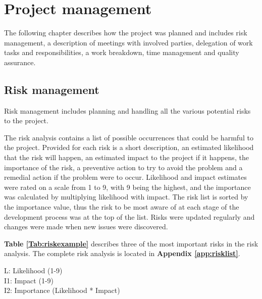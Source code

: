 
\chapter{Project management}

The following chapter describes how the project was planned and includes risk management, a description of meetings with involved parties, delegation of work tasks and responsibilities, a work breakdown, time management and quality assurance.

\section{Risk management}
\label{sec:risk_management}

Risk management includes planning and handling all the various potential risks to the project.\newline

The risk analysis contains a list of possible occurrences that could be harmful to the project. Provided for each risk is a short description, an estimated likelihood that the risk will happen, an estimated impact to the project if it happens, the importance of the risk, a preventive action to try to avoid the problem and a remedial action if the problem were to occur. Likelihood and impact estimates were rated on a scale from 1 to 9, with 9 being the highest, and the importance was calculated by multiplying likelihood with impact. The risk list is sorted by the importance value, thus the risk to be most aware of at each stage of the development process was at the top of the list. Risks were updated regularly and changes were made when new issues were discovered.\newline

\textbf{Table \ref{Tab:riskexample}} describes three of the most important risks in the risk analysis. The complete risk analysis is located in \textbf{Appendix \ref{app:risklist}}.

L: Likelihood (1-9)\\
I1: Impact (1-9)\\
I2: Importance (Likelihood * Impact)\\

